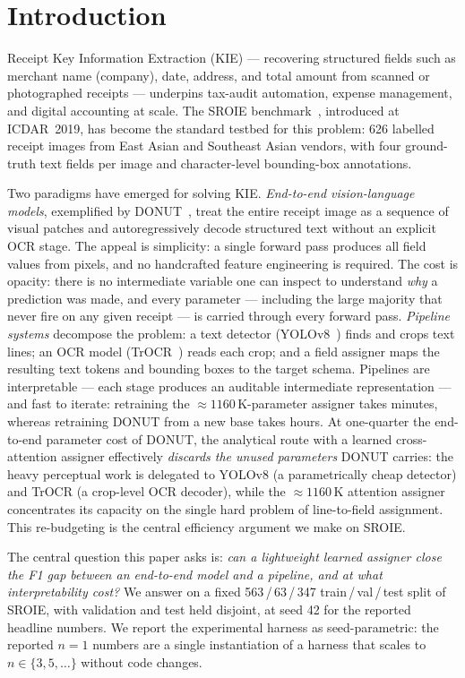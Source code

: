 \documentclass[conference]{IEEEtran}
\begin{document}
\section{Introduction}

Receipt Key Information Extraction (KIE) --- recovering structured
fields such as merchant name (company), date, address, and total amount
from scanned or photographed receipts --- underpins tax-audit
automation, expense management, and digital accounting at scale.
The SROIE benchmark~\cite{huang2019icdar}, introduced at ICDAR~2019,
has become the standard testbed for this problem: 626 labelled receipt
images from East Asian and Southeast Asian vendors, with four
ground-truth text fields per image and character-level bounding-box
annotations.

Two paradigms have emerged for solving KIE.
\emph{End-to-end vision-language models}, exemplified by
DONUT~\cite{kim2022donut}, treat the entire receipt image as a sequence
of visual patches and autoregressively decode structured text without an
explicit OCR stage.  The appeal is simplicity: a single forward pass
produces all field values from pixels, and no handcrafted feature
engineering is required.  The cost is opacity: there is no intermediate
variable one can inspect to understand \emph{why} a prediction was made,
and every parameter --- including the large majority that never fire on
any given receipt --- is carried through every forward pass.
\emph{Pipeline systems} decompose the problem: a text detector
(YOLOv8~\cite{jocher2023yolov8}) finds and crops text lines;
an OCR model (TrOCR~\cite{li2023trocr}) reads each crop;
and a field assigner maps the resulting text tokens and bounding boxes
to the target schema.  Pipelines are interpretable --- each stage
produces an auditable intermediate representation --- and fast to
iterate: retraining the $\approx1160\,$K-parameter
assigner takes minutes, whereas
retraining DONUT from a new base takes hours.
At one-quarter the end-to-end parameter cost of DONUT, the analytical
route with a learned cross-attention assigner effectively \emph{discards
the unused parameters} DONUT carries: the heavy perceptual work is
delegated to YOLOv8 (a parametrically cheap detector) and TrOCR (a
crop-level OCR decoder), while the $\approx1160\,$K
attention assigner concentrates its capacity on the single hard problem
of line-to-field assignment.  This re-budgeting is the central
efficiency argument we make on SROIE.

The central question this paper asks is: \emph{can a lightweight
learned assigner close the F1 gap between an end-to-end model and a
pipeline, and at what interpretability cost?}  We answer on a fixed
563\,/\,63\,/\,347 train\,/\,val\,/\,test split of SROIE, with
validation and test held disjoint, at seed 42 for the reported
headline numbers.  We report the experimental harness as
seed-parametric: the reported $n{=}1$ numbers are a single
instantiation of a harness that scales to $n\in\{3,5,\ldots\}$
without code changes.
\end{document}
